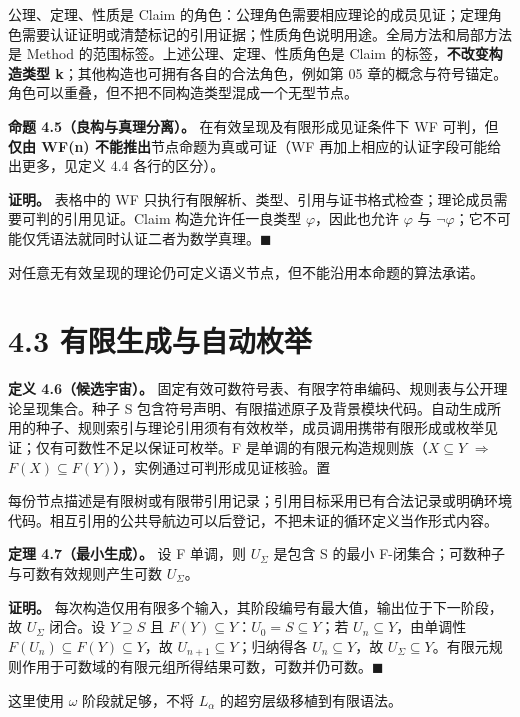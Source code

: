 \documentclass[UTF8,a4paper,zihao=-4,fontset=windows,openany]{ctexbook}
\newcommand{\mcsdisplay}[1]{%
  \par\addvspace{0.7em}%
  \sbox{\mcsmathbox}{\ensuremath{\displaystyle #1}}%
  \ifdim\wd\mcsmathbox>\linewidth
    \noindent\resizebox{\linewidth}{!}{\usebox{\mcsmathbox}}%
  \else
    \noindent\hspace*{\fill}\usebox{\mcsmathbox}\hspace*{\fill}%
  \fi
  \par\addvspace{0.7em}%
}
\def\ensuremath#1{#1}%
\begin{document}
公理、定理、性质是 Claim 的角色：公理角色需要相应理论的成员见证；定理角色需要认证证明或清楚标记的引用证据；性质角色说明用途。全局方法和局部方法是 Method 的范围标签。上述公理、定理、性质角色是 Claim 的标签，\textbf{不改变构造类型 k}；其他构造也可拥有各自的合法角色，例如第 05 章的概念与符号锚定。角色可以重叠，但不把不同构造类型混成一个无型节点。

\textbf{命题 4.5（良构与真理分离）。} 在有效呈现及有限形成见证条件下 WF 可判，但\textbf{仅由 WF(n) 不能推出}节点命题为真或可证（WF 再加上相应的认证字段可能给出更多，见定义 4.4 各行的区分）。

\textbf{证明。} 表格中的 WF 只执行有限解析、类型、引用与证书格式检查；理论成员需要可判的引用见证。Claim 构造允许任一良类型 \(\varphi\)，因此也允许 \(\varphi\) 与 \(\neg\varphi\)；它不可能仅凭语法就同时认证二者为数学真理。\(\blacksquare\)

对任意无有效呈现的理论仍可定义语义节点，但不能沿用本命题的算法承诺。

\section{4.3 有限生成与自动枚举}
\textbf{定义 4.6（候选宇宙）。} 固定有效可数符号表、有限字符串编码、规则表与公开理论呈现集合。种子 S 包含符号声明、有限描述原子及背景模块代码。自动生成所用的种子、规则索引与理论引用须有有效枚举，成员调用携带有限形成或枚举见证；仅有可数性不足以保证可枚举。F 是单调的有限元构造规则族（\(X\subseteq Y\) \(\Longrightarrow\) \(F(X)\subseteq F(Y)\)），实例通过可判形成见证核验。置


\mcsdisplay{U_0=S,\qquad U_{n+1}=U_n\cup F(U_n),\qquad
U_\Sigma=\bigcup_{n<\omega}U_n.}
\noindent 每份节点描述是有限树或有限带引用记录；引用目标采用已有合法记录或明确环境代码。相互引用的公共导航边可以后登记，不把未证的循环定义当作形式内容。

\textbf{定理 4.7（最小生成）。} 设 F 单调，则 \(U_\Sigma\) 是包含 S 的最小 F-闭集合；可数种子与可数有效规则产生可数 \(U_\Sigma\)。

\textbf{证明。} 每次构造仅用有限多个输入，其阶段编号有最大值，输出位于下一阶段，故 \(U_\Sigma\) 闭合。设 \(Y\supseteq S\) 且 \(F(Y)\subseteq Y\)：\(U_0=S\subseteq Y\)；若 \(U_n\subseteq Y\)，由单调性 \(F(U_n)\subseteq F(Y)\subseteq Y\)，故 \(U_{n+1}\subseteq Y\)；归纳得各 \(U_n\subseteq Y\)，故 \(U_\Sigma\subseteq Y\)。有限元规则作用于可数域的有限元组所得结果可数，可数并仍可数。\(\blacksquare\)

这里使用 \(\omega\) 阶段就足够，不将 \(L_\alpha\) 的超穷层级移植到有限语法。
\end{document}
